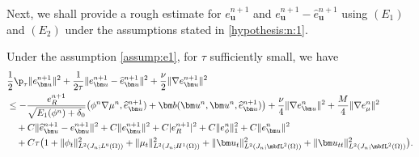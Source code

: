 Next, we shall provide a rough estimate for $e_{\bm u}^{n+1}$ and $e_{\bm u}^{n+1}-\widehat{e}_{\bm u}^{n+1}$ using $(E_1)$ and $(E_2)$ under the assumptions stated in \eqref{hypothesis:n:1}.
\begin{lemma} \label{lem:NS:E1}
	Under the assumption \eqref{assump:e1}, for $\tau$ sufficiently small, we have
	\begin{equation*}  
		\begin{aligned}
			& \frac{1}{2}\p_\tau \|e_{\bm u}^{n+1}\|^2 %
			+\frac{1}{2\tau}\|e_{\bm u}^{n+1}-\widehat{e}_{\bm u}^{n+1}\|^2 + \frac{\nu}{2} \|\nabla e_{\bm u}^{n+1}\|^2 \\
			&  \le  - \frac{e_R^{n+1}}{\sqrt{E_1(\phi^n)+\delta_0 } }\big( \phi^n \nabla \mu^n,\widehat e_{\bm u}^{n+1}) + \bm b(\bm u^n,  \bm u^n, \widehat{e}_{\bm u}^{n+1})  \big) + \frac{\nu}{4} \|\nabla e_{\bm u}^n\|^2 +\frac{M}{4}\|\nabla e_\mu^n\|^2 \\
			& \quad  +   C\|\widehat e_{\bm u}^{n+1}-e_{\bm u}^{n+1}\|^2 + C\|e_{\bm u}^{n+1}\|^2  + C|e_R^{n+1}|^2 +C\|e_\phi^n\|_1^2+ C \|e_{\bm u}^n\|^2  \\
			& \quad +  C\tau \big(1+ \|\phi_t\|_{L^2(J_n ; L^6(\Omega))}^2    +\|\mu_t\|_{L^2(J_n ; H^1(\Omega))}^2 
			+ \|\bm u_t\|_{L^2(J_n; \mbfL^2(\Omega))}^2 +\|\bm u_{tt}\|_{L^2(J_n; \mbfL^2(\Omega))}^2\big).
		\end{aligned}
	\end{equation*}
\end{lemma}
